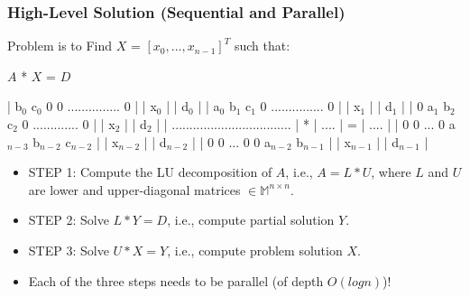 \documentclass{beamer}
\newcommand{\emp}[1]{\textcolor{DikuRed}{ #1}}
\newcommand{\mymath}[1]{$ #1 $}
\newcommand{\myindx}[1]{_{#1}}
\begin{document}
\begin{frame}[fragile,t]
  \frametitle{High-Level Solution (Sequential and Parallel)}

\begin{block}{Problem is to Find $X$ = $[x_0, ..., x_{n-1}]^T$ such that:} 

\begin{colorcode}[fontsize=\scriptsize]
                   \emp{\mymath{A}                   *    \mymath{X}     =    \mymath{D}}

 | b\mymath{\myindx{0}}  c\mymath{\myindx{0}}  0   0    ............... 0 |   | x\mymath{\myindx{0}}   |   | d\mymath{\myindx{0}}   |
 | a\mymath{\myindx{0}}  b\mymath{\myindx{1}}  c\mymath{\myindx{1}}  0    ............... 0 |   | x\mymath{\myindx{1}}   |   | d\mymath{\myindx{1}}   |
 | 0   a\mymath{\myindx{1}}  b\mymath{\myindx{2}}  c\mymath{\myindx{2}}  0  ............. 0 |   | x\mymath{\myindx{2}}   |   | d\mymath{\myindx{2}}   |
 | .................................. | * | .... | = | .... |
 | 0    0  ...    0    a\mymath{\myindx{n-3}} b\mymath{\myindx{n-2}} c\mymath{\myindx{n-2}} |   | x\mymath{\myindx{n-2}} |   | d\mymath{\myindx{n-2}} |
 | 0    0  ...    0    0    a\mymath{\myindx{n-2}} b\mymath{\myindx{n-1}} |   | x\mymath{\myindx{n-1}} |   | d\mymath{\myindx{n-1}} |

\end{colorcode}
\end{block}

\begin{itemize}
    \item STEP 1: Compute the LU decomposition of $A$, i.e., $A = L * U$, 
                  where $L$ and $U$ are lower and upper-diagonal matrices $\in \mathbb{M}^{n \times n}$. \bigskip
%
    \item STEP 2: Solve $L * Y = D$, i.e., compute partial solution $Y$. \bigskip
%
    \item STEP 3: Solve $U * X = Y$, i.e., compute problem solution $X$. \bigskip
%
    \item \emp{Each of the three steps needs to be parallel (of depth $O(log n)$)!}
\end{itemize}

\end{frame}
\end{document}
